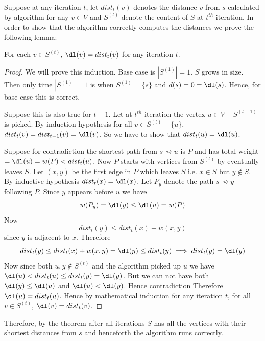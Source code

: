 Suppose at any iteration $t$, let $dist_t(v)$ denotes the distance $v$ from $s$ calculated by algorithm for any $v\in V$ and $S^{(t)}$ denote the content of $S$ at $t^{th}$ iteration. In order to show that the algorithm correctly computes the distances we prove the following lemma:
\begin{Theorem}{}{}
	For each $v\in S^{(t)}$, $\dl(v)=dist_t(v)$ for any iteration $t$.
\end{Theorem}
\begin{proof}
	We will prove this induction. Base case is $|S^{(1)}|=1$. $S$ grows in size. Then only time $|S^{(1)}|=1$ is when $S^{(1)}=\{s\}$ and $d(s)=0=\dl(s)$. Hence, for base case this is correct.

	Suppose this is also true for $t-1$. Let at $t^{th}$ iteration the vertex $u\in V-S^{(t-1)}$ is picked. By induction hypothesis for all $v\in S^{(t)}-\{u\}$, $dist_t(v)=dist_{t-1}(v)=\dl(v)$. So we have to show that $dist_{t}(u)=\dl(u)$.

	Suppose for contradiction the shortest path from $s\rightsquigarrow u$ is $P$ and has total weight $=\dl(u)=w(P)<dist_t(u)$. Now $P$ starts with vertices from $S^{(t)}$ by eventually leaves $S$. Let $(x,y)$ be the first edge in $P$ which leaves $S$ i.e. $x\in S$ but $y\notin S$. By inductive hypothesis $dist_t(x)=\dl(x)$. Let $P_y$ denote the path $s\rightsquigarrow y$ following $P$. Since $y$ appears before $u$ we have $$w(P_y)=\dl(y)\leq \dl(u)=w(P)$$Now $$dist_t(y)\leq dist_t(x)+w(x,y)$$ since $y$ is adjacent to $x$. Therefore $$dist_t(y)\leq dist_t(x)+w(x,y)=\dl(y)\leq dist_t(y)\implies dist_t(y)=\dl(y)$$Now since both $u,y\notin S^{(t)}$ and the algorithm picked up $u$ we have $\dl(u)<dist_t(u)\leq dist_t(y)=\dl(y)$. But we can not have both $\dl(y)\leq \dl(u)$ and $\dl(u)<\dl(y)$. Hence contradiction \ctr Therefore $\dl(u)=dist_t(u)$. Hence by mathematical induction for any iteration $t$, for all $v\in S^{(t)}$, $\dl(v)=dist_t(v)$.
\end{proof}

Therefore, by the theorem  after all iterations $S$ has all the vertices with their shortest distances from $s$ and henceforth the algorithm runs correctly.

